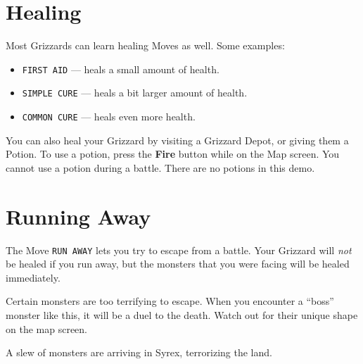 \documentclass[9pt,twocolumn,openany,article,crop]{memoir}
\newenvironment{ritemize}{\begin{itemize}\raggedright}{\end{itemize}}
\begin{document}
\fi


\section{Healing}

Most Grizzards can learn healing Moves as well. Some examples:

\begin{ritemize}
\item \texttt{FIRST AID} --- heals a small amount of health.
\item \texttt{SIMPLE CURE} --- heals a bit larger amount of health.
\item \texttt{COMMON CURE} --- heals even more health.
\end{ritemize}

You can also heal your Grizzard  by visiting a Grizzard Depot, or giving
them a Potion. To use a  potion, press the \textbf{Fire} button while on
the Map screen. You cannot use a potion during a battle. \ifdefined\DEMO
There are no potions in this demo. \fi

\section{Running Away}

The  Move \texttt{RUN  AWAY}  lets  you try  to  escape  from a  battle.
Your  Grizzard will  \emph{not}  be  healed if  you  run  away, but  the
monsters that you were facing will be healed immediately.

Certain  monsters  are too  terrifying  to  escape. When  you  encounter
a ``boss'' monster like this, it will  be a duel to the death. Watch out
for their unique shape on the map screen.

\pagebreak


A slew of monsters are arriving in Syrex, terrorizing the land.
\end{document}
